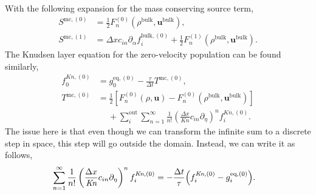 \documentclass[aps,physrev,twocolumn,10pt]{revtex4-2}
\begin{document}
With the following expansion for the mass conserving source term,
\begin{equation}
\begin{split}
    S^{\text{mc},(0)} &= \frac{1}{2}F_n^{(0)}\left(\rho^{\text{bulk}}, \bm{u}^\text{bulk}\right),\\
    S^{\text{mc},(1)} &= \Delta x c_{i\alpha} \partial_\alpha f_i^{\text{bulk}, (0)}+ \frac{1}{2}F_n^{(1)}\left(\rho^{\text{bulk}}, \bm{u}^\text{bulk}\right).
\end{split}
\end{equation}
The Knudsen layer equation for the zero-velocity population can be found similarly,
\begin{equation}
\begin{split}
    f_0^{\textit{Kn},(0)} &= g_0^{\text{eq},(0)} - \frac{\tau}{\Delta t}T^{\text{mc},(0)},\\
    T^{\text{mc},(0)} &= \frac{1}{2}\left[F_n^{(0)}\left(\rho, \bm{u}\right) - F_n^{(0)}\left(\rho^{\text{bulk}}, \bm{u}^\text{bulk}\right)\right]\\
    &\quad \ +\sum_i^\text{out}\sum_{n=1}^\infty \frac{1}{n!}\left(\frac{\Delta x}{\textit{Kn}} c_{in} \partial_\eta\right)^n f_i^{\textit{Kn}, (0)}.
\end{split}
\end{equation}
The issue here is that even though we can transform the infinite sum to a discrete step in space, this step will go outside the domain. Instead, we can write it as follows,
\begin{equation}
\begin{split}
    &\sum_{n=1}^\infty \frac{1}{n!}\left(\frac{\Delta x}{\textit{Kn}} c_{in} \partial_\eta\right)^n f_i^{\textit{Kn}, (0)} = -\frac{\Delta t}{\tau}\Bigl(f_i^{\textit{Kn},(0)}  - g_i^{\text{eq},(0)}\Bigr).
\end{split}
\end{equation}


\end{document}
